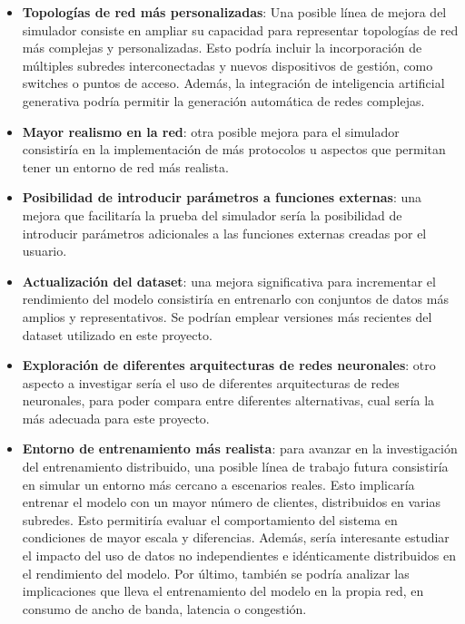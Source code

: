 \begin{itemize}
    \item \textbf{Topologías de red más personalizadas}: Una posible línea de mejora del simulador consiste en ampliar su capacidad para representar topologías de red más complejas y personalizadas. Esto podría incluir la incorporación de múltiples subredes interconectadas y nuevos dispositivos de gestión, como switches o puntos de acceso. Además, la integración de inteligencia artificial generativa podría permitir la generación automática de redes complejas.
    \item \textbf{Mayor realismo en la red}: otra posible mejora para el simulador consistiría en la implementación de más protocolos u aspectos que permitan tener un entorno de red más realista.
    \item \textbf{Posibilidad de introducir parámetros a funciones externas}: una mejora que facilitaría la prueba del simulador sería la posibilidad de introducir parámetros adicionales a las funciones externas creadas por el usuario.
    \item \textbf{Actualización del dataset}: una mejora significativa para incrementar el rendimiento del modelo consistiría en entrenarlo con conjuntos de datos más amplios y representativos. Se podrían emplear versiones más recientes del dataset utilizado en este proyecto.
    \item \textbf{Exploración de diferentes arquitecturas de redes neuronales}: otro aspecto a investigar sería el uso de diferentes arquitecturas de redes neuronales, para poder compara entre diferentes alternativas, cual sería la más adecuada para este proyecto.
    \item \textbf{Entorno de entrenamiento más realista}: para avanzar en la investigación del entrenamiento distribuido, una posible línea de trabajo futura consistiría en simular un entorno más cercano a escenarios reales. Esto implicaría entrenar el modelo con un mayor número de clientes, distribuidos en varias subredes. Esto permitiría evaluar el comportamiento del sistema en condiciones de mayor escala y diferencias. Además, sería interesante estudiar el impacto del uso de datos no independientes e idénticamente distribuidos en el rendimiento del modelo. Por último, también se podría analizar las implicaciones que lleva el entrenamiento del modelo en la propia red, en consumo de ancho de banda, latencia o congestión.
\end{itemize}
